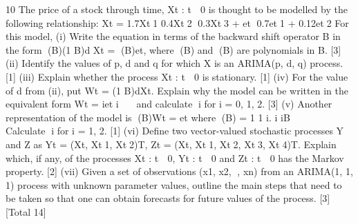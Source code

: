 
10 The price of a stock through time, {Xt : t  0} is thought to be modelled by the
following relationship:
Xt = 1.7Xt1 	 0.4Xt2 	0.3Xt3 + et 	0.7et1 + 0.12et2
For this model,
(i) Write the equation in terms of the backward shift operator B in the form
(B)(1 	 B)d Xt = (B)et,
where (B) and (B) are polynomials in B. [3]
(ii) Identify the values of p, d and q for which X is an ARIMA(p, d, q) process. [1]
(iii) Explain whether the process {Xt : t  0} is stationary. [1]
(iv) For the value of d from (ii), put Wt = (1 	 B)dXt. Explain why the model can
be written in the equivalent form
Wt = iet i  
and calculate i for i = 0, 1, 2. [3]
(v) Another representation of the model is
(B)Wt = et
where (B) = 1 	 1 i.
i iB 

  Calculate i for i = 1, 2. [1]
(vi) Define two vector-valued stochastic processes Y and Z as
Yt = (Xt, Xt1, Xt2)T, Zt = (Xt, Xt1, Xt2, Xt3, Xt4)T.
Explain which, if any, of the processes {Xt : t  0}, {Yt : t  0} and {Zt : t  0}
has the Markov property. [2]
(vii) Given a set of observations (x1, x2, , xn) from an ARIMA(1, 1, 1) process
with unknown parameter values, outline the main steps that need to be taken
so that one can obtain forecasts for future values of the process. [3]
[Total 14]



